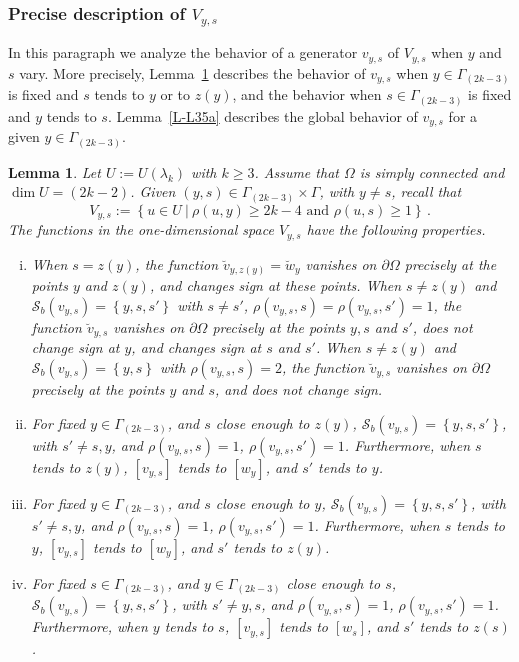 \documentclass[12pt,a4paper]{amsart}
\theoremstyle{plain} %
\newtheorem{lemma}[theorem]{Lemma}
\theoremstyle{definition}
\numberwithin{equation}{section}
\numberwithin{figure}{section}
\numberwithin{table}{section}
\newcommand{\cS}{\mathcal{S}}
\newcommand{\set}[1]{\left\lbrace #1 \right\rbrace}
\begin{document}
\subsubsection{Precise description of $V_{y,s}$}\label{SSS-hmn32bf}

 In this paragraph we analyze the behavior of a generator $v_{y,s}$ of $V_{y,s}$ when $y$ and $s$ vary. More precisely, Lemma~\ref{L-L34b} describes the behavior of $v_{y,s}$ when $y \in \Gamma_{(2k -3)}$ is fixed and $s$ tends to $y$ or to $z(y)$, and the behavior when $s \in \Gamma_{(2k -3)}$ is fixed and $y$ tends to $s$. Lemma~\ref{L-L35a} describes the global behavior of $v_{y,s}$ for a given $y \in \Gamma_{(2k -3)}$.

\begin{lemma}\label{L-L34b}
Let $U:=U(\lambda_k)$ with $k \ge 3$. Assume that  $\Omega$ is simply connected and  $\dim U = (2k-2)$. Given $(y,s) \in \Gamma_{(2k -3)} \times \Gamma $, with $ y \neq s$, recall that
%
\begin{equation*}
V_{y,s} := \set{u \in U ~|~ \rho(u,y) \ge 2k-4 \text{~and~} \rho(u,s) \ge 1}\,.
\end{equation*}
The functions in the one-dimensional space $V_{y,s}$ have the following properties.
  \begin{enumerate}[(i)]
  \item  When $s=z(y)$, the function $\breve{v}_{y,z(y)}=\breve{w}_y$ vanishes on $\partial \Omega$ precisely at the points $y$ and $z(y)$, and changes sign at these points. When $s \neq z(y)$ and $\cS_b(v_{y,s}) = \set{y,s,s'}$ with $s \neq s'$, $\rho(v_{y,s},s)=\rho(v_{y,s},s')=1$, the function $\breve{v}_{y,s}$ vanishes on $\partial \Omega$ precisely at the points $y, s$ and $s'$, does not change  sign at $y$, and changes sign at $s$ and $s'$. When $s \neq z(y)$ and $\cS_b(v_{y,s}) = \set{y,s}$ with  $\rho(v_{y,s},s)=2$, the function $\breve{v}_{y,s}$ vanishes on $\partial \Omega$ precisely at the points $y$ and $s$, and does not change sign.
   \item For fixed $y \in \Gamma_{(2k -3)}$, and $s$ close enough to $z(y)$, $\cS_b(v_{y,s}) = \set{y,s,s'}$, with $s' \neq s, y$,  and $\rho(v_{y,s},s) = 1$, $\rho(v_{y,s},s') = 1$. Furthermore, when $s$ tends to $z(y)$, $[v_{y,s}]$ tends to $[w_{y}]$, and $s'$ tends to $y$.
  \item For fixed $y \in \Gamma_{(2k -3)}$, and $s$ close enough to $y$, $\cS_b(v_{y,s}) = \set{y,s,s'}$, with $s' \neq s, y$,  and $\rho(v_{y,s},s) = 1$, $\rho(v_{y,s},s') = 1$. Furthermore, when $s$ tends to $y$, $[v_{y,s}]$ tends to $[w_{y}]$, and $s'$ tends to $z(y)$.
  \item  For fixed $s \in \Gamma_{(2k -3)}$, and $y\in \Gamma_{(2k -3)}$ close enough to $s$, $\cS_b(v_{y,s}) = \set{y,s,s'}$, with $s' \neq y,s$,  and $\rho(v_{y,s},s) = 1$, $\rho(v_{y,s},s') = 1$. Furthermore, when $y$ tends to $s$, $[v_{y,s}]$ tends to $[w_s]$, and $s'$ tends to $z(s)$.
\end{enumerate}
\end{lemma}%
\end{document}
